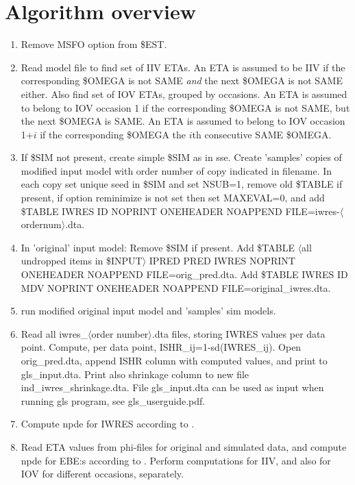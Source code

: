 \section{Algorithm overview}

\begin{enumerate}
\item Remove MSFO option from \$EST.
\item Read model file to find set of IIV ETAs. An ETA is assumed to be IIV if the corresponding \$OMEGA is not SAME
\emph{and} the next \$OMEGA is not SAME either. Also find set of IOV ETAs, grouped by occasions.
An ETA is assumed to belong to IOV occasion 1 if the corresponding \$OMEGA is not SAME, but the next \$OMEGA is SAME. 
An ETA is assumed to belong to IOV occasion 1+$i$ if the corresponding \$OMEGA the $i$th consecutive SAME \$OMEGA. 
\item If \$SIM not present, create simple \$SIM as in sse. Create 'samples' copies of modified input model with order number of copy indicated in filename. In each copy set unique seed in \$SIM and set NSUB=1, remove old \$TABLE if present, 
if option reminimize is not set then set MAXEVAL=0, and add \$TABLE IWRES ID NOPRINT ONEHEADER NOAPPEND FILE=iwres-$\langle$ordernum$\rangle$.dta. 
\item In 'original' input model: Remove \$SIM if present. Add \$TABLE $\langle$all undropped items in \$INPUT$\rangle$ IPRED PRED IWRES NOPRINT ONEHEADER NOAPPEND FILE=orig\_pred.dta. Add \$TABLE IWRES ID MDV NOPRINT ONEHEADER NOAPPEND FILE=original\_iwres.dta. 
\item run modified original input model and 'samples' sim models.
\item Read all iwres\_$\langle$order number$\rangle$.dta files, storing IWRES values per data point. Compute, per data point, ISHR\_ij=1-sd(IWRES\_ij). Open orig\_pred.dta, append ISHR column with computed values, and print to gls\_input.dta. Print also shrinkage column to new file ind\_iwres\_shrinkage.dta. File gls\_input.dta can be used as input when running gls program, see gls\_userguide.pdf. 
\item Compute npde for IWRES according to \cite{Comets}.
\item Read ETA values from 
phi-files for original and simulated data, and compute npde for EBE:s according to \cite{Comets}.
Perform computations for IIV, and also for IOV for different occasions, separately. 
\end{enumerate}


